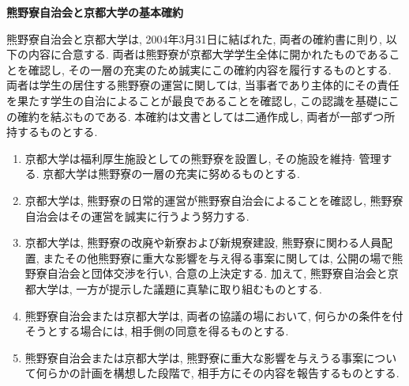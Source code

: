 \documentclass[10pt,b5jsbook,dvips,dvipdfmx,openany]{jsbook}
\theoremstyle{definition}
\begin{document}
		\begin{shadebox}

		\centerline{ \bf 熊野寮自治会と京都大学の基本確約}

		熊野寮自治会と京都大学は, 2004年3月31日に結ばれた, 両者の確約書に則り, 以下の内容に合意する. 両者は熊野寮が京都大学学生全体に開かれたものであることを確認し, その一層の充実のため誠実にこの確約内容を履行するものとする. 両者は学生の居住する熊野寮の運営に関しては, 当事者であり主体的にその責任を果たす学生の自治によることが最良であることを確認し, この認識を基礎にこの確約を結ぶものである.
本確約は文書としては二通作成し, 両者が一部ずつ所持するものとする.

		\begin{enumerate}
		\renewcommand{\labelenumi}{(\arabic{enumi})}
		\item 京都大学は福利厚生施設としての熊野寮を設置し, その施設を維持$ \cdot $ 管理する. 京都大学は熊野寮の一層の充実に努めるものとする.
		\item 京都大学は, 熊野寮の日常的運営が熊野寮自治会によることを確認し, 熊野寮自治会はその運営を誠実に行うよう努力する.
		\item 京都大学は, 熊野寮の改廃や新寮および新規寮建設, 熊野寮に関わる人員配置, またその他熊野寮に重大な影響を与え得る事案に関しては, 公開の場で熊野寮自治会と団体交渉を行い, 合意の上決定する. 加えて, 熊野寮自治会と京都大学は, 一方が提示した議題に真摯に取り組むものとする.
		\item 熊野寮自治会または京都大学は, 両者の協議の場において, 何らかの条件を付そうとする場合には, 相手側の同意を得るものとする.
		\item 熊野寮自治会または京都大学は, 熊野寮に重大な影響を与えうる事案について何らかの計画を構想した段階で, 相手方にその内容を報告するものとする.
		\end{enumerate}


		\end{shadebox}
\end{document}
